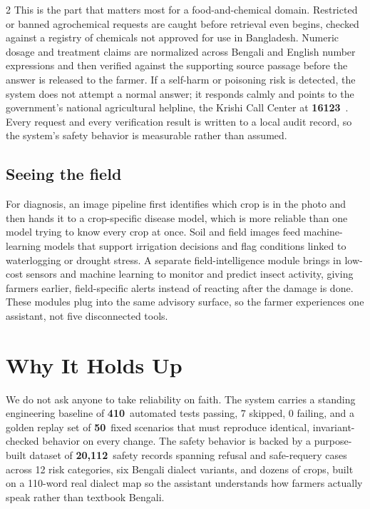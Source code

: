 \documentclass[11pt]{article}
\newcommand{\stat}[2]{{\color{brandgreen}\textbf{#1}}\ #2}
\begin{document}
\begin{multicols}{2}
This is the part that matters most for a food-and-chemical domain. Restricted or banned agrochemical requests are caught before retrieval even begins, checked against a registry of chemicals not approved for use in Bangladesh. Numeric dosage and treatment claims are normalized across Bengali and English number expressions and then verified against the supporting source passage before the answer is released to the farmer. If a self-harm or poisoning risk is detected, the system does not attempt a normal answer; it responds calmly and points to the government's national agricultural helpline, the Krishi Call Center at \stat{16123}{}. Every request and every verification result is written to a local audit record, so the system's safety behavior is measurable rather than assumed.

\subsection{Seeing the field}

For diagnosis, an image pipeline first identifies which crop is in the photo and then hands it to a crop-specific disease model, which is more reliable than one model trying to know every crop at once. Soil and field images feed machine-learning models that support irrigation decisions and flag conditions linked to waterlogging or drought stress. A separate field-intelligence module brings in low-cost sensors and machine learning to monitor and predict insect activity, giving farmers earlier, field-specific alerts instead of reacting after the damage is done. These modules plug into the same advisory surface, so the farmer experiences one assistant, not five disconnected tools.

\section{Why It Holds Up}

We do not ask anyone to take reliability on faith. The system carries a standing engineering baseline of \stat{410}{automated tests passing, 7 skipped, 0 failing}, and a golden replay set of \stat{50}{fixed scenarios} that must reproduce identical, invariant-checked behavior on every change. The safety behavior is backed by a purpose-built dataset of \stat{20{,}112}{safety records} spanning refusal and safe-requery cases across 12 risk categories, six Bengali dialect variants, and dozens of crops, built on a 110-word real dialect map so the assistant understands how farmers actually speak rather than textbook Bengali.


\end{multicols}
\end{document}
